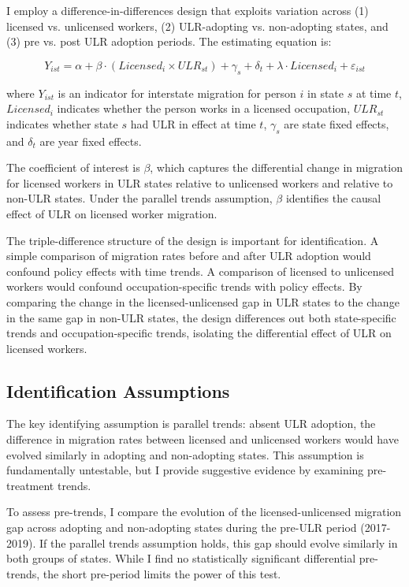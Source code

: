 \documentclass[12pt]{article}
\begin{document}
I employ a difference-in-differences design that exploits variation across (1) licensed vs. unlicensed workers, (2) ULR-adopting vs. non-adopting states, and (3) pre vs. post ULR adoption periods. The estimating equation is:

\begin{equation}
Y_{ist} = \alpha + \beta \cdot (Licensed_i \times ULR_{st}) + \gamma_s + \delta_t + \lambda \cdot Licensed_i + \varepsilon_{ist}
\end{equation}

where $Y_{ist}$ is an indicator for interstate migration for person $i$ in state $s$ at time $t$, $Licensed_i$ indicates whether the person works in a licensed occupation, $ULR_{st}$ indicates whether state $s$ had ULR in effect at time $t$, $\gamma_s$ are state fixed effects, and $\delta_t$ are year fixed effects.

The coefficient of interest is $\beta$, which captures the differential change in migration for licensed workers in ULR states relative to unlicensed workers and relative to non-ULR states. Under the parallel trends assumption, $\beta$ identifies the causal effect of ULR on licensed worker migration.

The triple-difference structure of the design is important for identification. A simple comparison of migration rates before and after ULR adoption would confound policy effects with time trends. A comparison of licensed to unlicensed workers would confound occupation-specific trends with policy effects. By comparing the change in the licensed-unlicensed gap in ULR states to the change in the same gap in non-ULR states, the design differences out both state-specific trends and occupation-specific trends, isolating the differential effect of ULR on licensed workers.

\subsection{Identification Assumptions}

The key identifying assumption is parallel trends: absent ULR adoption, the difference in migration rates between licensed and unlicensed workers would have evolved similarly in adopting and non-adopting states. This assumption is fundamentally untestable, but I provide suggestive evidence by examining pre-treatment trends.

To assess pre-trends, I compare the evolution of the licensed-unlicensed migration gap across adopting and non-adopting states during the pre-ULR period (2017-2019). If the parallel trends assumption holds, this gap should evolve similarly in both groups of states. While I find no statistically significant differential pre-trends, the short pre-period limits the power of this test.
\end{document}

